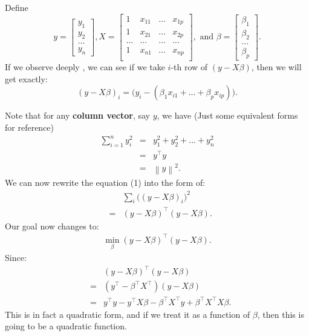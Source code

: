 \documentclass{article}
\theoremstyle{MyNonumberplain}
\theoremstyle{break}
\newcommand{\T}{^\intercal}
\newcommand{\bt}[1]{\beta_{#1}}
\theoremstyle{break}
\begin{document}
\begin{thmbox}
    \begin{prfbox}
        Define 
        $$y=
            \begin{bmatrix}
                y_1 \\
                y_2 \\
                ... \\
                y_n 
            \end{bmatrix}
            , X=
            \begin{bmatrix}
                1 & x_{11} &...& x_{1p}\\
                1 & x_{21} &...& x_{2p}\\
                ...&...&...&...\\
                1 & x_{n1} &...& x_{np}\\
            \end{bmatrix} 
            , \text{ and } \beta=
            \begin{bmatrix}
                \beta_1 \\
                \beta_2 \\
                ... \\
                \beta_p
            \end{bmatrix}.$$
    If we observe deeply , we can see if we take $i$-th row of $(y-X\beta)$, then we will get exactly: $$(y-X\beta)_i=\bigl(y_i-(\bt{1}x_{i1}+...+\bt{p}x_{ip})\bigr).$$

    Note that for any \textbf{column vector}, say $y$, we have (Just some equivalent forms for reference)
    \begin{eqnarray*}
        \sum_{i=1}^n y_i^2 &=& y_1^2+y_2^2+...+y_n^2 \\
                           &=& y\T y\\
                           &=& \left\lVert y\right\rVert^2.
    \end{eqnarray*}
    We can now rewrite the equation (1) into the form of:
    \begin{eqnarray*}
        & & \sum_i \bigl((y-X\beta)_i\bigr)^2\\
        &=& (y-X\beta)\T (y-X\beta).
    \end{eqnarray*}
    Our goal now changes to:
    \begin{eqnarray}
        \min_\beta (y-X\beta)\T (y-X\beta).
    \end{eqnarray}
    Since:
    \begin{eqnarray*}
        & &(y-X\beta)\T (y-X\beta) \\
        &=&(y\T-\beta\T X\T) (y-X\beta)\\
        &=&y\T y - y\T X\beta - \beta\T X\T y + \beta\T X\T X\beta.
    \end{eqnarray*}
    This is in fact a quadratic form, and if we treat it as a function of $\beta$, then this is going to be a quadratic function.


\end{prfbox}
\end{thmbox}
\end{document}

